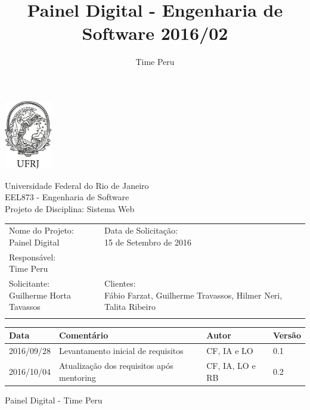 \documentclass[a4paper, 12pt]{article}
\author{Time Peru}
\title{Painel Digital - Engenharia de Software 2016/02}
\begin{document}
\begin{minipage}[c][3cm][c]{3cm}
	\includegraphics[height=3cm]{img/ufrj_logo.png}
\end{minipage}
\begin{minipage}[c][3cm][c]{10cm}
	Universidade Federal do Rio de Janeiro \\
	EEL873 - Engenharia  de Software \\
	Projeto de Disciplina: Sistema Web
\end{minipage}

\begin{table}[ht]
	\centering

	\begin{tabular}{p{6cm}p{10cm}}
		\hline
		\cellcolor{gray} & \cellcolor{gray}\\
		\hline
		\pbox{20cm}{Nome do Projeto: \\ Painel Digital}
		&\pbox{20cm}{Data de Solicitação: \\ 15 de Setembro de 2016}\\[2ex]
		\hline
		\pbox{20cm}{Responsável: \\ Time Peru}\\[2ex]
		\hline
		\pbox{20cm}{Solicitante: \\ Guilherme Horta Tavassos}
		&\pbox{10cm}{Clientes: \\ Fábio Farzat, Guilherme Travassos, Hilmer Neri, Talita Ribeiro}\\[4ex]
		\hline
		\cellcolor{gray} & \cellcolor{gray}\\
		\hline
	\end{tabular}
\end{table}%

\begin{table}[ht]
	\rowcolors{1}{}{}
	\centering

	\begin{tabular}{p{2cm}p{8cm}p{4cm}p{1cm}}
		\hline
		\cellcolor{gray}Data&\cellcolor{gray}Comentário&\cellcolor{gray}Autor&\cellcolor{gray}Versão  \\
		\hline
		2016/09/28&Levantamento inicial de requisitos &CF, IA e LO&0.1\\
        2016/10/04&Atualiza\c{c}\~ao dos requisitos ap\'{o}s mentoring&CF, IA, LO e RB&0.2\\
		\hline

	\end{tabular}
\end{table}%
\vspace{100pt}
\begin{center}
	\huge{Painel Digital - Time Peru}
	\vspace{95pt}
\end{center}
\newpage
\tableofcontents
\newpage
\end{document}
